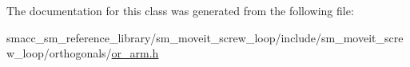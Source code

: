 The documentation for this class was generated from the following file\+:\begin{DoxyCompactItemize}
\item 
smacc\+\_\+sm\+\_\+reference\+\_\+library/sm\+\_\+moveit\+\_\+screw\+\_\+loop/include/sm\+\_\+moveit\+\_\+screw\+\_\+loop/orthogonals/\hyperlink{sm__moveit__screw__loop_2include_2sm__moveit__screw__loop_2orthogonals_2or__arm_8h}{or\+\_\+arm.\+h}\end{DoxyCompactItemize}
